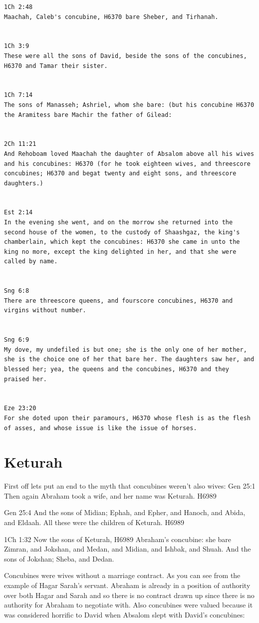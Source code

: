 \documentclass[11pt]{article}
\begin{document}
{\begin{lstlisting}
1Ch 2:48
Maachah, Caleb's concubine, H6370 bare Sheber, and Tirhanah.


1Ch 3:9
These were all the sons of David, beside the sons of the concubines, H6370 and Tamar their sister.


1Ch 7:14
The sons of Manasseh; Ashriel, whom she bare: (but his concubine H6370 the Aramitess bare Machir the father of Gilead:


2Ch 11:21
And Rehoboam loved Maachah the daughter of Absalom above all his wives and his concubines: H6370 (for he took eighteen wives, and threescore concubines; H6370 and begat twenty and eight sons, and threescore daughters.)


Est 2:14
In the evening she went, and on the morrow she returned into the second house of the women, to the custody of Shaashgaz, the king's chamberlain, which kept the concubines: H6370 she came in unto the king no more, except the king delighted in her, and that she were called by name.


Sng 6:8
There are threescore queens, and fourscore concubines, H6370 and virgins without number.


Sng 6:9
My dove, my undefiled is but one; she is the only one of her mother, she is the choice one of her that bare her. The daughters saw her, and blessed her; yea, the queens and the concubines, H6370 and they praised her.


Eze 23:20
For she doted upon their paramours, H6370 whose flesh is as the flesh of asses, and whose issue is like the issue of horses.
\end{lstlisting}

\section{Keturah}
First off lets put an end to the myth that concubines weren't also wives:
Gen 25:1
Then again Abraham took a wife, and her name was Keturah. H6989

Gen 25:4
And the sons of Midian; Ephah, and Epher, and Hanoch, and Abida, and Eldaah. All these were the children of Keturah. H6989

1Ch 1:32
Now the sons of Keturah, H6989 Abraham's concubine: she bare Zimran, and Jokshan, and Medan, and Midian, and Ishbak, and Shuah. And the sons of Jokshan; Sheba, and Dedan.

Concubines were wives without a marriage contract. As you can see from the example of Hagar Sarah's servant. Abraham is already in a position of authority over both Hagar and Sarah and so there is no contract drawn up since there is no authority for Abraham to negotiate with. Also concubines were valued because it was considered horrific to David when Absalom slept with David's concubines:

}
\end{document}
